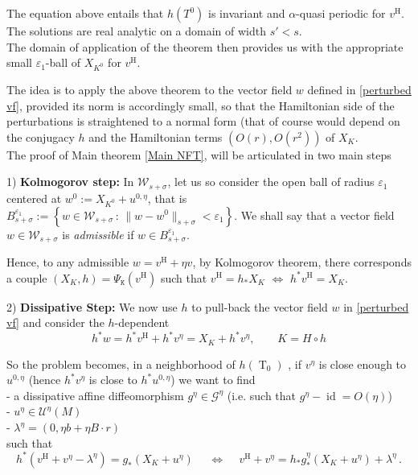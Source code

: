 \documentclass[oneside, 11pt]{amsbook}
\newcommand{\set}[1]{{\left\{#1\right\}}}
\newcommand{\eps}{\varepsilon}
\newcommand{\vh}{v^{\text{H}}} %
\newcommand{\id}{\operatorname{id}}
\newcommand{\cG}{{\mathcal G}}
\newcommand{\cU}{{\mathcal U}}
\newcommand{\cW}{{\mathcal W}}
\newcommand{\tK}{{\mathtt{K}}}
\newcommand{\0}{{(0)}}
\newcommand{\3}{{(3)}}
\numberwithin{equation}{section}
\numberwithin{defn}{section}
\numberwithin{prop}{section}
\numberwithin{cor}{section}
\numberwithin{lemma}{section}
\numberwithin{rmk}{section}
\numberwithin{corollary}{section}
\newcommand{\To}{\operatorname{T}_0}
\begin{document}
The equation above entails that $h(T^0)$ is invariant and $\alpha$-quasi periodic for $\vh$.  The solutions are real analytic on a domain of width $s'< s$. \\
 
 The domain of application of the theorem then provides us with the appropriate small $\eps_1$-ball of $X_{K^0}$ for $\vh$. 




The idea is to apply the above theorem to the vector field $w$ defined in \eqref{perturbed vf}, provided its norm is accordingly small, so that the Hamiltonian side of the perturbations is straightened to a normal form (that of course would depend on the conjugacy $h$ and the Hamiltonian terms $(O(r),O(r^2))$ of $X_K$. \\
The proof of Main theorem \ref{Main NFT}, will be articulated in two main steps

 
 \medskip
 
1) \textbf{Kolmogorov step:} In $\cW_{s+\sigma}$, let us so consider the open ball of radius $\eps_{1}$ centered at $w^{0} := X_{K^{0}} + u^{0,\eta}$, that is $B_{s+\sigma}^{\eps_{1}} := \set{w\in\cW_{s+\sigma}\,:\, \|w - w^0\|_{{s+\sigma}} < \eps_{1}}$. We shall say that a vector field $w\in\cW_{s+\sigma}$ is \emph{admissible} if $w\in B_{s+\sigma}^{\eps_{1}} $. 

Hence, to any admissible $w = \vh + \eta v$, by Kolmogorov theorem, there corresponds a couple $(X_{K}, h) = \Psi_\tK(\vh)$ such that $\vh = h_*X_K \,\,\Leftrightarrow\,\, h^{*}\vh = X_{K}$.

\smallskip
\smallskip

2) \textbf{Dissipative Step:} We now use $h$ to pull-back the vector field $w$ in \eqref{perturbed vf} and consider the $h$-dependent  $$h^*w= h^*\vh + h^*v^\eta = X_{K} +  h^*v^\eta,\quad \quad K = H\circ h$$

 {So the problem becomes, in a neighborhood of $h(\To)$ }, if  $v^\eta$  is close enough to $u^{0,\eta}$ (hence $h^{*}v^\eta$ is close to $h^*u^{0,\eta}$) we want to find \\
- a dissipative affine diffeomorphism  $g^\eta\in\cG^\eta$ (i.e. such that $g^\eta - \id = O(\eta)$)\\
 - $u^\eta\in\cU^\eta(M)$\\
 - $\lambda^\eta = (0, \eta b + \eta B\cdot r)$ \\
 such that 
\begin{equation}\label{dissipative normal f}
	h^*(\vh + v^\eta - \lambda^\eta ) = g_*(X_K + u^\eta) \, \quad \, \Leftrightarrow \, \quad \vh +  v^\eta = h_*g^\eta_*(X_K + u^\eta) + \lambda^\eta\,.
	\end{equation}
 \\
\end{document}
